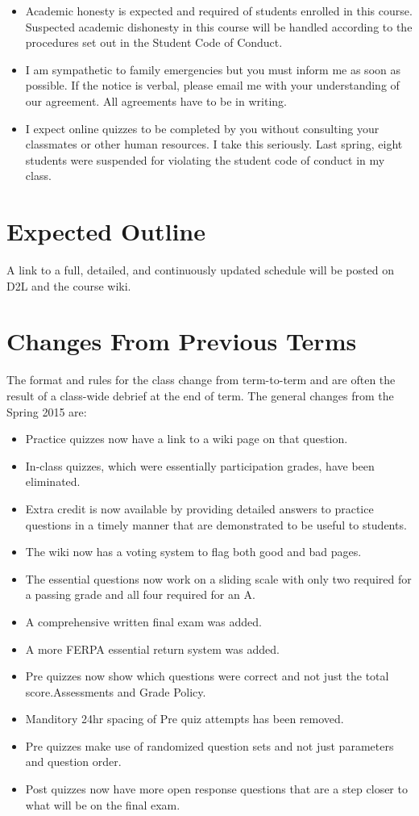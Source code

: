 \documentclass[letterpaper,10pt]{article}
\begin{document}
\begin{itemize}
\item Academic honesty is expected and required of students enrolled
  in this course.  Suspected academic dishonesty in this course will
  be handled according to the procedures set out in the Student Code
  of Conduct.

\item I am sympathetic to family emergencies but you must inform me as
  soon as possible. If the notice is verbal, please email me with your
  understanding of our agreement. All agreements have to be in
  writing.

\item I expect online quizzes to be completed by you without consulting your classmates or other human resources.  I take this seriously.  Last spring, eight students were suspended for violating the student code of conduct in my class.

\end{itemize}


\section{Expected Outline}
A link to a full, detailed, and continuously updated schedule will be
posted on D2L and the course wiki.


\section{Changes From Previous Terms}
The format and rules for the class change from term-to-term and are often the result of a class-wide debrief at the end of term. The general changes from the Spring 2015 are:

\begin{itemize}
    \item Practice quizzes now have a link to a wiki page on that question.
    \item In-class quizzes, which were essentially participation grades, have been eliminated.
    \item Extra credit is now available by providing detailed answers to practice questions in a timely manner that are demonstrated to be useful to students.
    \item The wiki now has a voting system to flag both good and bad pages.
    \item The essential questions now work on a sliding scale with only two required for a passing grade and all four required for an A.
    \item A comprehensive written final exam was added.
    \item A more FERPA essential return system was added.
    \item Pre quizzes now show which questions were correct and not just the total score.Assessments and Grade Policy.
    \item Manditory 24hr spacing of Pre quiz attempts has been removed.
    \item Pre quizzes make use of randomized question sets and not just parameters and question order.
    \item Post quizzes now have more open response questions that are a step closer to what will be on the final exam.
\end{itemize}
\end{document}
